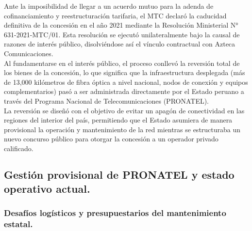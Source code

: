 Ante la imposibilidad de llegar a un acuerdo mutuo para la adenda de cofinanciamiento y reestructuración tarifaria, el MTC 
declaró la caducidad definitiva de la concesión en el año 2021 mediante la Resolución Ministerial N° 631-2021-MTC/01. 
Esta resolución 
se ejecutó unilateralmente bajo la causal de razones de interés público, disolviéndose así el vínculo contractual con 
Azteca Comunicaciones.\\
Al fundamentarse en el 
interés público, el proceso conllevó la reversión total de los bienes de la concesión, lo que significa que la infraestructura desplegada
(más de 13,000 kilómetros de fibra óptica a nivel nacional, nodos de conexión y equipos complementarios) pasó a ser administrada directamente 
por el Estado peruano a través del Programa Nacional de Telecomunicaciones (PRONATEL).\\
La reversión se diseñó con el objetivo de evitar un apagón de conectividad en las regiones del interior del país, permitiendo que el Estado 
asumiera de manera provisional la operación y mantenimiento de la red mientras se estructuraba un nuevo concurso público para otorgar la 
concesión a un operador privado calificado.

\subsection{Gestión provisional de PRONATEL y estado operativo actual.}
\subsubsection{Desafíos logísticos y presupuestarios del mantenimiento estatal.}

